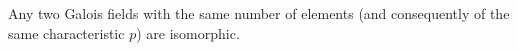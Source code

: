 Any two Galois fields with the same number of elements (and consequently of the same characteristic $p$) are isomorphic.
